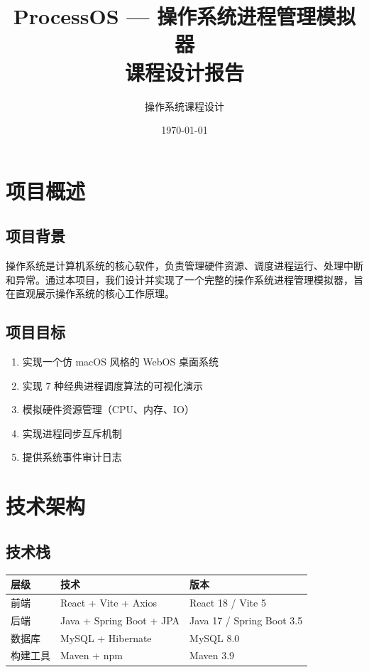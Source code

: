 \documentclass[12pt,a4paper]{article}
\title{\textbf{ProcessOS --- 操作系统进程管理模拟器}\\[0.5em]\large 课程设计报告}
\author{操作系统课程设计}
\date{\today}
\begin{document}
\maketitle
\tableofcontents
\newpage

\section{项目概述}

\subsection{项目背景}
操作系统是计算机系统的核心软件，负责管理硬件资源、调度进程运行、处理中断和异常。通过本项目，我们设计并实现了一个完整的操作系统进程管理模拟器，旨在直观展示操作系统的核心工作原理。

\subsection{项目目标}
\begin{enumerate}
    \item 实现一个仿 macOS 风格的 WebOS 桌面系统
    \item 实现 7 种经典进程调度算法的可视化演示
    \item 模拟硬件资源管理（CPU、内存、IO）
    \item 实现进程同步互斥机制
    \item 提供系统事件审计日志
\end{enumerate}

\section{技术架构}

\subsection{技术栈}

\begin{table}[H]
\centering
\begin{tabular}{lll}
\toprule
\textbf{层级} & \textbf{技术} & \textbf{版本} \\
\midrule
前端 & React + Vite + Axios & React 18 / Vite 5 \\
后端 & Java + Spring Boot + JPA & Java 17 / Spring Boot 3.5 \\
数据库 & MySQL + Hibernate & MySQL 8.0 \\
构建工具 & Maven + npm & Maven 3.9 \\
\bottomrule
\end{tabular}
\end{table}
\end{document}
